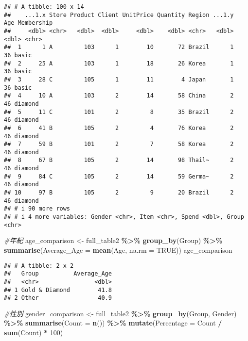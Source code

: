 \documentclass[
]{article}
\newenvironment{Shaded}{\begin{snugshade}}{\end{snugshade}}
\newcommand{\AttributeTok}[1]{\textcolor[rgb]{0.13,0.29,0.53}{#1}}
\newcommand{\CommentTok}[1]{\textcolor[rgb]{0.56,0.35,0.01}{\textit{#1}}}
\newcommand{\ConstantTok}[1]{\textcolor[rgb]{0.56,0.35,0.01}{#1}}
\newcommand{\DecValTok}[1]{\textcolor[rgb]{0.00,0.00,0.81}{#1}}
\newcommand{\FunctionTok}[1]{\textcolor[rgb]{0.13,0.29,0.53}{\textbf{#1}}}
\newcommand{\NormalTok}[1]{#1}
\newcommand{\OtherTok}[1]{\textcolor[rgb]{0.56,0.35,0.01}{#1}}
\newcommand{\SpecialCharTok}[1]{\textcolor[rgb]{0.81,0.36,0.00}{\textbf{#1}}}
\begin{document}
\begin{verbatim}
## # A tibble: 100 x 14
##    ...1.x Store Product Client UnitPrice Quantity Region ...1.y   Age Membership
##     <dbl> <chr>   <dbl>  <dbl>     <dbl>    <dbl> <chr>   <dbl> <dbl> <chr>     
##  1      1 A         103      1        10       72 Brazil      1    36 basic     
##  2     25 A         103      1        18       26 Korea       1    36 basic     
##  3     28 C         105      1        11        4 Japan       1    36 basic     
##  4     10 A         103      2        14       58 China       2    46 diamond   
##  5     11 C         101      2         8       35 Brazil      2    46 diamond   
##  6     41 B         105      2         4       76 Korea       2    46 diamond   
##  7     59 B         101      2         7       58 Korea       2    46 diamond   
##  8     67 B         105      2        14       98 Thail~      2    46 diamond   
##  9     84 C         105      2        14       59 Germa~      2    46 diamond   
## 10     97 B         105      2         9       20 Brazil      2    46 diamond   
## # i 90 more rows
## # i 4 more variables: Gender <chr>, Item <chr>, Spend <dbl>, Group <chr>
\end{verbatim}

\begin{Shaded}
\begin{Highlighting}[]
\CommentTok{\#年紀}
\NormalTok{age\_comparison }\OtherTok{\textless{}{-}}\NormalTok{ full\_table2 }\SpecialCharTok{\%\textgreater{}\%}
  \FunctionTok{group\_by}\NormalTok{(Group) }\SpecialCharTok{\%\textgreater{}\%}
  \FunctionTok{summarise}\NormalTok{(}\AttributeTok{Average\_Age =} \FunctionTok{mean}\NormalTok{(Age, }\AttributeTok{na.rm =} \ConstantTok{TRUE}\NormalTok{))}
\NormalTok{age\_comparison}
\end{Highlighting}
\end{Shaded}

\begin{verbatim}
## # A tibble: 2 x 2
##   Group          Average_Age
##   <chr>                <dbl>
## 1 Gold & Diamond        41.8
## 2 Other                 40.9
\end{verbatim}

\begin{Shaded}
\begin{Highlighting}[]
\CommentTok{\#性別}
\NormalTok{gender\_comparison }\OtherTok{\textless{}{-}}\NormalTok{ full\_table2 }\SpecialCharTok{\%\textgreater{}\%}
  \FunctionTok{group\_by}\NormalTok{(Group, Gender) }\SpecialCharTok{\%\textgreater{}\%}
  \FunctionTok{summarise}\NormalTok{(}\AttributeTok{Count =} \FunctionTok{n}\NormalTok{()) }\SpecialCharTok{\%\textgreater{}\%}
  \FunctionTok{mutate}\NormalTok{(}\AttributeTok{Percentage =}\NormalTok{ Count }\SpecialCharTok{/} \FunctionTok{sum}\NormalTok{(Count) }\SpecialCharTok{*} \DecValTok{100}\NormalTok{)}
\end{Highlighting}
\end{Shaded}
\end{document}
